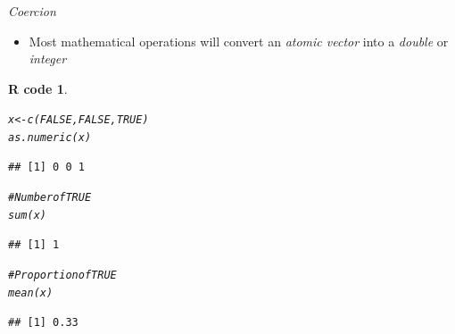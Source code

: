 \documentclass[11pt]{beamer}\usepackage[]{graphicx}\usepackage[]{color}
\makeatletter
\newcommand{\hlnum}[1]{\textcolor[rgb]{0.063,0.58,0.627}{#1}}%
\newcommand{\hlcom}[1]{\textcolor[rgb]{0.588,0.588,0.588}{#1}}%
\newcommand{\hlstd}[1]{\textcolor[rgb]{0.196,0.196,0.196}{#1}}%
\newcommand{\hlkwb}[1]{\textcolor[rgb]{0.627,0,0.314}{#1}}%
\newcommand{\hlkwd}[1]{\textcolor[rgb]{0.78,0.227,0.412}{#1}}%
\newenvironment{kframe}{%
 \def\at@end@of@kframe{}%
 \ifinner\ifhmode%
  \def\at@end@of@kframe{\end{minipage}}%
  \begin{minipage}{\columnwidth}%
 \fi\fi%
 \def\FrameCommand##1{\hskip\@totalleftmargin \hskip-\fboxsep
 \colorbox{shadecolor}{##1}\hskip-\fboxsep
     \hskip-\linewidth \hskip-\@totalleftmargin \hskip\columnwidth}%
 \MakeFramed {\advance\hsize-\width
   \@totalleftmargin\z@ \linewidth\hsize
   \@setminipage}}%
 {\par\unskip\endMakeFramed%
 \at@end@of@kframe}
\newenvironment{knitrout}{}{} %
\newtheorem{rcode}{R code}[section]
\makeatother
\begin{document}
\begin{frame}[fragile]{\textit{Coercion}}
\begin{itemize}
\item Most mathematical operations will convert an \textit{atomic vector} into a \textit{double} or \textit{integer}
\end{itemize}
\begin{knitrout}\footnotesize
{}\color{fgcolor}\begin{kframe}
\begin{rcode}\label{unnamed-chunk-17}\begin{alltt}
\hlstd{x} \hlkwb{<-} \hlkwd{c}\hlstd{(}\hlnum{FALSE}\hlstd{,} \hlnum{FALSE}\hlstd{,} \hlnum{TRUE}\hlstd{)}
\hlkwd{as.numeric}\hlstd{(x)}
\end{alltt}
\begin{verbatim}
## [1] 0 0 1
\end{verbatim}
\begin{alltt}
\hlcom{# Number of TRUE}
\hlkwd{sum}\hlstd{(x)}
\end{alltt}
\begin{verbatim}
## [1] 1
\end{verbatim}
\begin{alltt}
\hlcom{# Proportion of TRUE}
\hlkwd{mean}\hlstd{(x)}
\end{alltt}
\begin{verbatim}
## [1] 0.33
\end{verbatim}
\end{rcode}\end{kframe}
\end{knitrout}
\end{frame}
\end{document}
